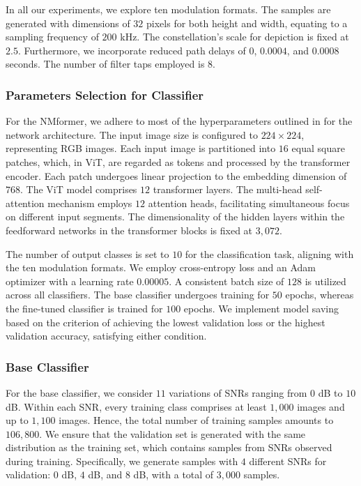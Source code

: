 In all our experiments, we explore ten modulation formats. The samples are generated with dimensions of $32$ pixels for both height and width, equating to a sampling frequency of $200$ kHz. The constellation's scale for depiction is fixed at $2.5$. Furthermore, we incorporate reduced path delays of $0$, $0.0004$, and $0.0008$ seconds. The number of filter taps employed is $8$.

\subsubsection{Parameters Selection for Classifier}

For the NMformer, we adhere to most of the hyperparameters outlined in \cite{dosovitskiy2020image} for the network architecture. The input image size is configured to $224\times 224$, representing RGB images. Each input image is partitioned into $16$ equal square patches, which, in ViT, are regarded as tokens and processed by the transformer encoder. Each patch undergoes linear projection to the embedding dimension of $768$. The ViT model comprises $12$ transformer layers. The multi-head self-attention mechanism employs $12$ attention heads, facilitating simultaneous focus on different input segments. The dimensionality of the hidden layers within the feedforward networks in the transformer blocks is fixed at $3,072$.

The number of output classes is set to $10$ for the classification task, aligning with the ten modulation formats. We employ cross-entropy loss and an Adam optimizer with a learning rate $0.00005$. A consistent batch size of $128$ is utilized across all classifiers. The base classifier undergoes training for $50$ epochs, whereas the fine-tuned classifier is trained for $100$ epochs. We implement model saving based on the criterion of achieving the lowest validation loss or the highest validation accuracy, satisfying either condition.

\subsubsection{Base Classifier}

For the base classifier, we consider $11$ variations of SNRs ranging from $0$ dB to $10$ dB. Within each SNR, every training class comprises at least $1,000$ images and up to $1,100$ images. Hence, the total number of training samples amounts to $106,800$. We ensure that the validation set is generated with the same distribution as the training set, which contains samples from SNRs observed during training. Specifically, we generate samples with $4$ different SNRs for validation: $0$ dB, $4$ dB, and $8$ dB, with a total of $3,000$ samples.

